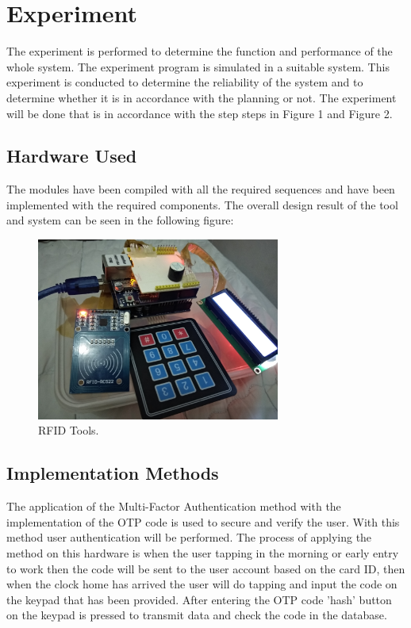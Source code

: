 \section{Experiment}
\label{Experiment}
The experiment is performed to determine the function and performance of the whole system. The experiment program is simulated in a suitable system. This experiment is conducted to determine the reliability of the system and to determine whether it is in accordance with the planning or not. The experiment will be done that is in accordance with the step steps in Figure 1 and Figure 2.

\subsection{Hardware Used}
The modules have been compiled with all the required sequences and have been implemented with the required components. The overall design result of the tool and system can be seen in the following figure:
\begin{figure}[ht]
\begin{center}
\includegraphics[width=8cm]{figures/Tools.jpg}
\end{center}
\caption{RFID Tools.
\label{eq:30}}
\end{figure} 

\subsection{Implementation Methods}
The application of the Multi-Factor Authentication method with the implementation of the OTP code is used to secure and verify the user. With this method user authentication will be performed.
The process of applying the method on this hardware is when the user tapping in the morning or early entry to work then the code will be sent to the user account based on the card ID, then when the clock home has arrived the user will do tapping and input the code on the keypad that has been provided.
After entering the OTP code 'hash' button on the keypad is pressed to transmit data and check the code in the database.

